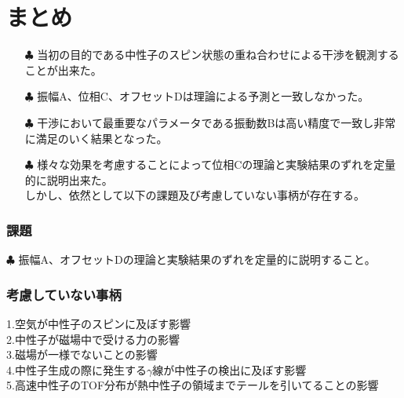 
\section{まとめ}
\begin{itemize}
\item[$\clubsuit$]当初の目的である中性子のスピン状態の重ね合わせによる干渉を観測することが出来た。\\
\item[$\clubsuit$]振幅A、位相C、オフセットDは理論による予測と一致しなかった。\\
\item[$\clubsuit$]干渉において最重要なパラメータである振動数Bは高い精度で一致し非常に満足のいく結果となった。\\
\item[$\clubsuit$]様々な効果を考慮することによって位相Cの理論と実験結果のずれを定量的に説明出来た。\\
しかし、依然として以下の課題及び考慮していない事柄が存在する。
\end{itemize}
\subsubsection{課題}
$\clubsuit$
振幅A、オフセットDの理論と実験結果のずれを定量的に説明すること。\\
\subsubsection{考慮していない事柄}
\hspace{-9.5pt}1.空気が中性子のスピンに及ぼす影響\\
2.中性子が磁場中で受ける力の影響\\
3.磁場が一様でないことの影響\\
4.中性子生成の際に発生する$\gamma$線が中性子の検出に及ぼす影響\\
5.\mbox{高速中性子のTOF分布が熱中性子の領域までテールを引いてることの影響}\\
